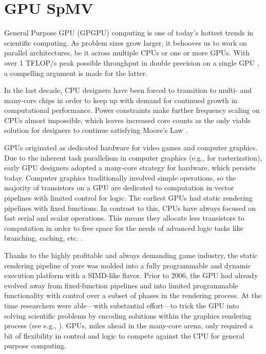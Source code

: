 \documentclass{report}
\begin{document}
\fi

\chapter{GPU SpMV}
\label{chap:gpu_rbffd}

General Purpose GPU (GPGPU) computing is one of today's hottest trends in scientific computing. As problem sizes grow larger, it behooves us to work on parallel architectures, be it across multiple CPUs or one or more GPUs. With over 1 TFLOP/s peak possible throughput in double precision on a single GPU \cite{KeplerFactSheet}, a compelling argument is made for the latter. 

In the last decade, CPU designers have been forced to transition to multi- and many-core chips in order to keep up with demand for continued growth in computational performance. Power constraints make further frequency scaling on CPUs almost impossible, which leaves increased core counts as the only viable solution for designers to continue satisfying Moore's Law \cite{Owens2007}. 


GPUs originated as dedicated hardware for video games and computer graphics. 
Due to the inherent task parallelism in computer graphics  (e.g., for rasterization), early GPU designers adopted a many-core strategy for hardware, which persists today. Computer graphics traditionally involved simple operations, so the majority of transistors on a GPU are dedicated to computation in vector pipelines with limited control for logic. The earliest GPUs had static rendering pipelines with fixed functions. In contrast to this, CPUs have always focused on fast serial and scalar operations. This means they allocate less transistors to computation in order to free space for the needs of advanced logic tasks like branching, caching, etc. \cite{Owens2007,CudaGuide2013}. %

Thanks to the highly profitable and always demanding game industry, the static rendering pipeline of yore was molded into a fully programmable and dynamic execution platform with a SIMD-like flavor. Prior to 2006, the GPU had already evolved away from fixed-function pipelines and into limited programmable functionality with control over a subset of phases in the rendering process. At the time researchers were able---with substantial effort---to trick the GPU into solving scientific problems by encoding solutions within the graphics rendering process (see e.g., \cite{Trendall2000,Jansen2007,Harris2005,Owens2007}).
GPUs, miles ahead in the many-core arena, only required a bit of flexibility in control and logic to compete against the CPU for general purpose computing.  
\end{document}
